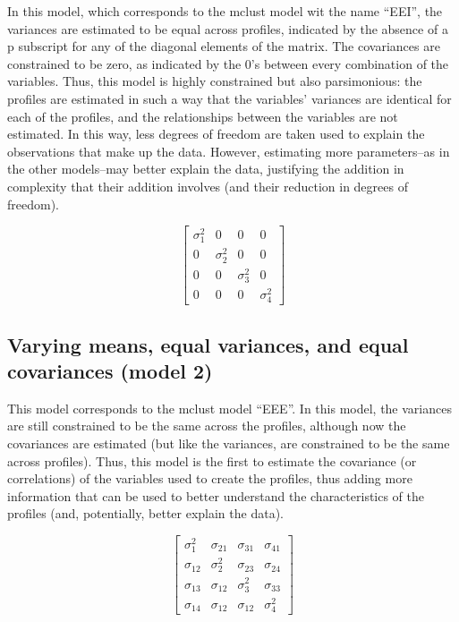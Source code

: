 \documentclass[]{msu-thesis}
\theoremstyle{definition}
\theoremstyle{definition}
\theoremstyle{definition}
\theoremstyle{remark}
\begin{document}
\begin{appendices}
In this model, which corresponds to the mclust model wit the name
``EEI'', the variances are estimated to be equal across profiles,
indicated by the absence of a p subscript for any of the diagonal
elements of the matrix. The covariances are constrained to be zero, as
indicated by the 0's between every combination of the variables. Thus,
this model is highly constrained but also parsimonious: the profiles are
estimated in such a way that the variables' variances are identical for
each of the profiles, and the relationships between the variables are
not estimated. In this way, less degrees of freedom are taken used to
explain the observations that make up the data. However, estimating more
parameters--as in the other models--may better explain the data,
justifying the addition in complexity that their addition involves (and
their reduction in degrees of freedom).

\[
\left[ \begin{matrix} { \sigma }_{ 1 }^{ 2 } & 0 & 0 & 0 \\ 0 & { \sigma }_{ 2 }^{ 2 } & 0 & 0 \\ 0 & 0 & { \sigma }_{ 3 }^{ 2 } & 0 \\ 0 & 0 & 0 & { \sigma }_{ 4 }^{ 2 } \end{matrix} \right]
\]

\subsection{Varying means, equal variances, and equal covariances (model
2)}\label{varying-means-equal-variances-and-equal-covariances-model-2}

This model corresponds to the mclust model ``EEE''. In this model, the
variances are still constrained to be the same across the profiles,
although now the covariances are estimated (but like the variances, are
constrained to be the same across profiles). Thus, this model is the
first to estimate the covariance (or correlations) of the variables used
to create the profiles, thus adding more information that can be used to
better understand the characteristics of the profiles (and, potentially,
better explain the data).

\[
\left[ \begin{matrix} { \sigma }_{ 1 }^{ 2 } & { \sigma }_{ 21 } & { \sigma }_{ 31 } & { \sigma }_{ 41 } \\ { \sigma }_{ 12 } & { \sigma }_{ 2 }^{ 2 } & { \sigma }_{ 23 } & { \sigma }_{ 24 } \\ { \sigma }_{ 13 } & { \sigma }_{ 12 } & { \sigma }_{ 3 }^{ 2 } & { \sigma }_{ 33 } \\ { \sigma }_{ 14 } & { \sigma }_{ 12 } & { \sigma }_{ 12 } & { \sigma }_{ 4 }^{ 2 } \end{matrix} \right]
\]


\end{appendices}
\end{document}

